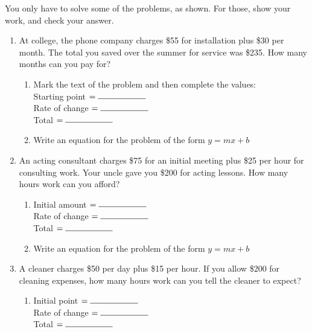 \documentclass[12pt, oneside]{article}
\begin{document}
  You only have to solve some of the problems, as shown. For those, show your work, and check your answer.
  \begin{enumerate}
    \subsubsection*{Classwork: Word problem Wednesday}

  \item At college, the phone company charges \$55 for installation plus \$30 per month. The total you saved over the summer for service was \$235. How many months can you pay for?
  \begin{enumerate}
    \item Mark the text of the problem and then complete the values:\\[0.5cm]
    Starting point $= \rule{2cm}{0.15mm}$ \\[0.5cm]
    Rate of change $= \rule{2cm}{0.15mm}$ \\[0.5cm]
    Total $= \rule{2cm}{0.15mm}$ \\

    \item Write an equation for the problem of the form $y=mx+b$\\[3cm]

  \end{enumerate}

  \item An acting consultant charges \$75 for an initial meeting plus \$25 per hour for consulting work. Your uncle gave you \$200 for acting lessons. How many hours work can you afford?
  \begin{enumerate}
    \item Initial amount $= \rule{2cm}{0.15mm}$ \\[0.5cm]
    Rate of change $= \rule{2cm}{0.15mm}$ \\[0.5cm]
    Total $= \rule{2cm}{0.15mm}$ \\

    \item Write an equation for the problem of the form $y=mx+b$\\[1.5cm]
  \end{enumerate}

\newpage

  \item A cleaner charges \$50 per day plus \$15 per hour. If you allow \$200 for cleaning expenses, how many hours work can you tell the cleaner to expect?
  \begin{enumerate}
    \item Initial point $= \rule{2cm}{0.15mm}$ \\[0.5cm]
    Rate of change $= \rule{2cm}{0.15mm}$ \\[0.5cm]
    Total $= \rule{2cm}{0.15mm}$ \\


\end{enumerate}
\end{enumerate}
\end{document}
